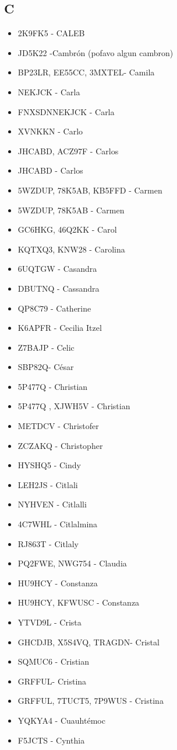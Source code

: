 \subsection*{C}
\begin{itemize}[leftmargin=*,nosep]
\item 2K9FK5 - CALEB
\item JD5K22 -Cambrón (pofavo algun cambron)
\item BP23LR, EE55CC, 3MXTEL- Camila
\item NEKJCK - Carla
\item FNXSDNNEKJCK - Carla
\item XVNKKN - Carlo
\item JHCABD, ACZ97F - Carlos
\item JHCABD - Carlos
\item 5WZDUP, 78K5AB, KB5FFD - Carmen
\item 5WZDUP, 78K5AB - Carmen
\item GC6HKG, 46Q2KK - Carol
\item KQTXQ3, KNW28 - Carolina
\item 6UQTGW - Casandra
\item DBUTNQ - Cassandra
\item QP8C79 - Catherine
\item K6APFR - Cecilia Itzel
\item Z7BAJP - Celic
\item SBP82Q- César
\item 5P477Q - Christian
\item 5P477Q , XJWH5V - Christian
\item METDCV - Christofer
\item ZCZAKQ - Christopher
\item HYSHQ5 - Cindy
\item LEH2JS - Citlali
\item NYHVEN - Citlalli
\item 4C7WHL - Citlalmina
\item RJ863T - Citlaly
\item PQ2FWE, NWG754 - Claudia
\item HU9HCY - Constanza
\item HU9HCY, KFWUSC - Constanza
\item YTVD9L - Crista
\item GHCDJB, X5S4VQ, TRAGDN- Cristal
\item SQMUC6 - Cristian
\item GRFFUL- Cristina
\item GRFFUL, 7TUCT5, 7P9WUS - Cristina
\item YQKYA4 - Cuauhtémoc
\item F5JCTS - Cynthia
\end{itemize}

